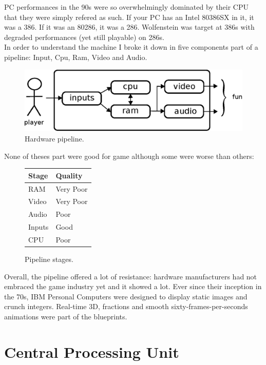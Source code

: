 \documentclass[book.tex]{subfiles}
\begin{document}
PC performances in the 90s were so overwhelmingly dominated by their CPU that they were simply refered as such. If your PC has an Intel 80386SX in it, it was a 386. If it was an 80286, it was a 286. Wolfenstein was target at 386s with degraded performances (yet still playable) on 286s.\\
In order to understand the machine I broke it down in five components part of a pipeline: Input, Cpu, Ram, Video and Audio.\\
 \bigskip
\begin{figure}[H]
\centering
\includegraphics[scale=1.2]{imgs/fun_pipeline.eps}
%
\caption{Hardware pipeline.}
\label{fig:digraph}
\end{figure}

None of theses part were good for game although some were worse than others:

 \bigskip

\begin{figure}[H]
\centering
\begin{tabularx}{\textwidth}{ X X  }
  \toprule
  \textbf{Stage} & \textbf{Quality} \\ \bottomrule
  RAM & Very Poor \\ 
  Video & Very Poor \\ 
  Audio & Poor \\ 
  Inputs & Good \\ \bottomrule
  CPU & Poor \\ 
\end{tabularx}
\caption{Pipeline stages.}  \label{fig:Pipeline stages}
\end{figure}

Overall, the pipeline offered a lot of resistance: hardware manufacturers had not embraced the game industry yet and it showed a lot. Ever since their inception in the 70s, IBM Personal Computers were designed to display static images and crunch integers. Real-time 3D, fractions and smooth sixty-frames-per-seconds animations were part of the blueprints.

\section{Central Processing Unit}
\end{document}
